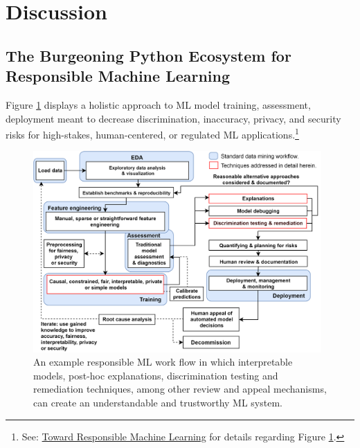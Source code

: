\documentclass[information,article,submit,moreauthors,pdftex]{definitions/mdpi}
\begin{document}
\section{Discussion}\label{sec:disc}

\subsection{The Burgeoning Python Ecosystem for Responsible Machine Learning}

Figure \ref{fig:blueprint} displays a holistic approach to ML model training, assessment, deployment meant to decrease discrimination, inaccuracy, privacy, and security risks for high-stakes, human-centered, or regulated ML applications.\footnote{See: \href{https://github.com/jphall663/hc_ml}{Toward Responsible Machine Learning} for details regarding Figure \ref{fig:blueprint}.}      

\begin{figure}[H]
	\centering
	\includegraphics[width=11cm]{img/blueprint.png}
	\caption{An example responsible ML work flow in which interpretable models, post-hoc explanations, discrimination testing and remediation techniques, among other review and appeal mechanisms, can create an understandable and trustworthy ML system.}
	\label{fig:blueprint}
\end{figure} 
\end{document}
